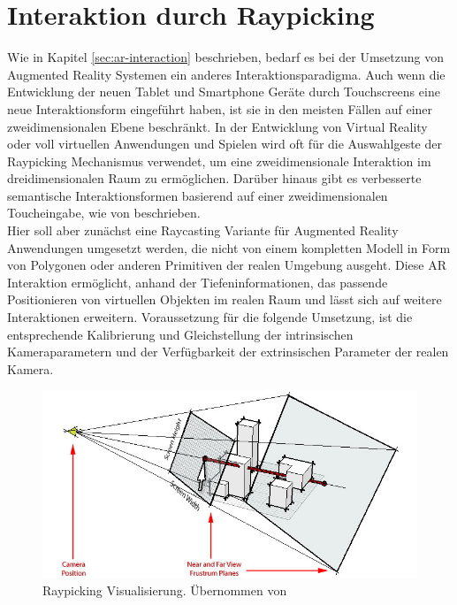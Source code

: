 \section{Interaktion durch Raypicking} \label{sec:ar-depth-interaction}

Wie in Kapitel \ref{sec:ar-interaction} beschrieben, bedarf es bei der Umsetzung von Augmented Reality Systemen ein anderes Interaktionsparadigma. Auch wenn die Entwicklung der neuen Tablet und Smartphone Geräte durch Touchscreens eine neue Interaktionsform eingeführt haben, ist sie in den meisten Fällen auf einer zweidimensionalen Ebene beschränkt. In der Entwicklung von Virtual Reality oder voll virtuellen Anwendungen und Spielen wird oft für die Auswahlgeste der Raypicking Mechanismus verwendet, um eine zweidimensionale Interaktion im dreidimensionalen Raum zu ermöglichen. Darüber hinaus gibt es verbesserte semantische Interaktionsformen basierend auf einer zweidimensionalen Toucheingabe, wie von \citet{elmqvist2008semantic} beschrieben.\\

Hier soll aber zunächst eine Raycasting Variante für Augmented Reality Anwendungen umgesetzt werden, die nicht von einem kompletten Modell in Form von Polygonen oder anderen Primitiven der realen Umgebung ausgeht. Diese AR Interaktion ermöglicht, anhand der Tiefeninformationen, das passende Positionieren von virtuellen Objekten im realen Raum und lässt sich auf weitere Interaktionen erweitern. Voraussetzung für die folgende Umsetzung, ist die entsprechende Kalibrierung und Gleichstellung der intrinsischen Kameraparametern und der Verfügbarkeit der extrinsischen Parameter der realen Kamera. \\

\begin{figure}[h]
  \centering
	\includegraphics[width=1.0\textwidth]{content/images/methods/interaction.jpg} 
  \caption{Raypicking Visualisierung. Übernommen von \citet{gluUn11:online}}
  \label{fig:interaction}
\end{figure}

